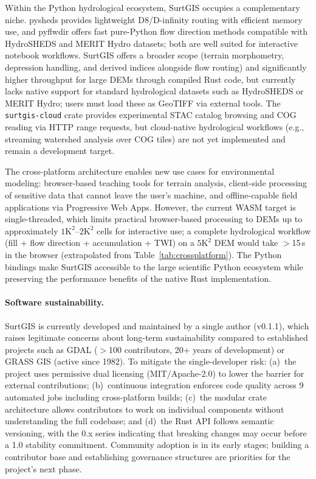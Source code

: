 \documentclass[preprint,review,12pt,authoryear]{elsarticle}
\begin{document}
Within the Python hydrological ecosystem, SurtGIS occupies a complementary niche. pysheds \citep{bartos2020pysheds} provides lightweight D8/D-infinity routing with efficient memory use, and pyflwdir \citep{eilander2021pyflwdir} offers fast pure-Python flow direction methods compatible with HydroSHEDS and MERIT Hydro datasets; both are well suited for interactive notebook workflows. SurtGIS offers a broader scope (terrain morphometry, depression handling, and derived indices alongside flow routing) and significantly higher throughput for large DEMs through compiled Rust code, but currently lacks native support for standard hydrological datasets such as HydroSHEDS or MERIT Hydro; users must load these as GeoTIFF via external tools. The \texttt{surtgis-cloud} crate provides experimental STAC catalog browsing and COG reading via HTTP range requests, but cloud-native hydrological workflows (e.g., streaming watershed analysis over COG tiles) are not yet implemented and remain a development target.

The cross-platform architecture enables new use cases for environmental modeling: browser-based teaching tools for terrain analysis, client-side processing of sensitive data that cannot leave the user's machine, and offline-capable field applications via Progressive Web Apps. However, the current WASM target is single-threaded, which limits practical browser-based processing to DEMs up to approximately $1\text{K}^2$--$2\text{K}^2$ cells for interactive use; a complete hydrological workflow (fill + flow direction + accumulation + TWI) on a $5\text{K}^2$ DEM would take $>$15\,s in the browser (extrapolated from Table~\ref{tab:crossplatform}). The Python bindings make SurtGIS accessible to the large scientific Python ecosystem while preserving the performance benefits of the native Rust implementation.

\paragraph{Software sustainability.} SurtGIS is currently developed and maintained by a single author (v0.1.1), which raises legitimate concerns about long-term sustainability compared to established projects such as GDAL ($>$100 contributors, 20+ years of development) or GRASS GIS (active since 1982). To mitigate the single-developer risk: (a)~the project uses permissive dual licensing (MIT/Apache-2.0) to lower the barrier for external contributions; (b)~continuous integration enforces code quality across 9 automated jobs including cross-platform builds; (c)~the modular crate architecture allows contributors to work on individual components without understanding the full codebase; and (d)~the Rust API follows semantic versioning, with the 0.x series indicating that breaking changes may occur before a 1.0 stability commitment. Community adoption is in its early stages; building a contributor base and establishing governance structures are priorities for the project's next phase.
\end{document}
